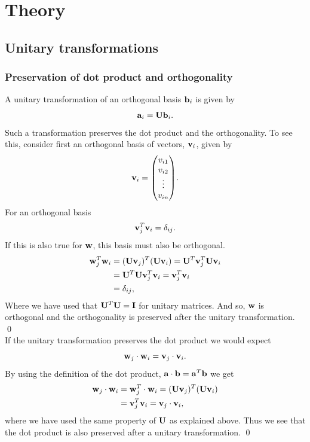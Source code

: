 \documentclass[notitlepage, reprint, nofootinbib]{revtex4-1}
\begin{document}
\section{Theory}
\subsection{Unitary transformations} 
\subsubsection{Preservation of dot product and orthogonality}\label{dot-orthog}
A unitary transformation of an orthogonal basis $\vb{b}_i$ is given by
\begin{equation}\label{proof1}\vb{a}_i = \vb{U}\vb{b}_i.\end{equation}
Such a transformation preserves the dot product and the orthogonality. To see this, consider first an orthogonal basis of vectors, $\vb{v}_i$, given by
$$\vb{v}_i=\mqty( v_{i1} \\ v_{i2} \\ \vdots \\ v_{in}).$$
For an orthogonal basis 
$$\vb{v}_j^T \vb{v}_i = \delta_{ij}.$$
If this is also true for $\vb{w}$, this basis must also be orthogonal. 
\begin{align*}
	\vb{w}_j^T\vb{w}_i &= (\vb{U}\vb{v}_j)^T (\vb{U}\vb{v}_i) = \vb{U}^T\vb{v}_j^T\vb{U}\vb{v}_i\\ 
	&=\vb{U}^T\vb{U}\vb{v}_j^T\vb{v}_i = \vb{v}_j^T\vb{v}_i \\
	&= \delta_{ij},
\end{align*}
Where we have used that $\vb{U}^T\vb{U}=\vb{I}$ for unitary matrices. And so, $\vb{w}$ is orthogonal and the orthogonality is preserved after the unitary transformation.	 \qed \\[2mm]
If the unitary transformation preserves the dot product we would expect 
$$\vb{w}_j\cdot \vb{w}_i = \vb{v}_j\cdot \vb{v}_i.$$
By using the definition of the dot product, $\vb{a}\cdot\vb{b}=\vb{a}^T\vb{b}$ we get
\begin{align*}
	\vb{w}_j\cdot \vb{w}_i &= \vb{w}_j^T\cdot\vb{w}_i=(\vb{U}\vb{v}_j)^T(\vb{U}\vb{v}_i)\\
	&=\vb{v}_j^T\vb{v}_i=\vb{v}_j\cdot\vb{v}_i,
\end{align*}
where we have used the same property of $\vb{U}$ as explained above. Thus we see that the dot product is also preserved after a unitary transformation. \qed
\end{document}
